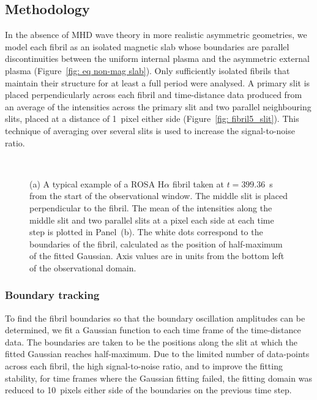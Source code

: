 \subsection{Methodology}

In the absence of MHD wave theory in more realistic asymmetric geometries, we model each fibril as an isolated magnetic slab whose boundaries are parallel discontinuities between the uniform internal plasma and the asymmetric external plasma (Figure~\ref{fig: eq non-mag slab}). Only sufficiently isolated fibrils that maintain their structure for at least a full period were analysed. A primary slit is placed perpendicularly across each fibril and time-distance data produced from an average of the intensities across the primary slit and two parallel neighbouring slits, placed at a distance of 1~pixel either side (Figure~\ref{fig: fibril5_slit}). This technique of averaging over several slits is used to increase the signal-to-noise ratio.

\begin{figure}
	\centering
	 \\
	\caption{(a) A typical example of a ROSA H$\alpha$ fibril taken at $t=399.36$~s from the start of the observational window. The middle slit is placed perpendicular to the fibril. The mean of the intensities along the middle slit and two parallel slits at a pixel each side at each time step is plotted in Panel~(b). The white dots correspond to the boundaries of the fibril, calculated as the position of half-maximum of the fitted Gaussian. Axis values are in units from the bottom left of the observational domain.}
\end{figure}


\subsubsection{Boundary tracking} \label{sec:boundary tracking}

To find the fibril boundaries so that the boundary oscillation amplitudes can be determined, we fit a Gaussian function to each time frame of the time-distance data. The boundaries are taken to be the positions along the slit at which the fitted Gaussian reaches half-maximum. Due to the limited number of data-points across each fibril, the high signal-to-noise ratio, and to improve the fitting stability, for time frames where the Gaussian fitting failed, the fitting domain was reduced to 10~pixels either side of the boundaries on the previous time step.

